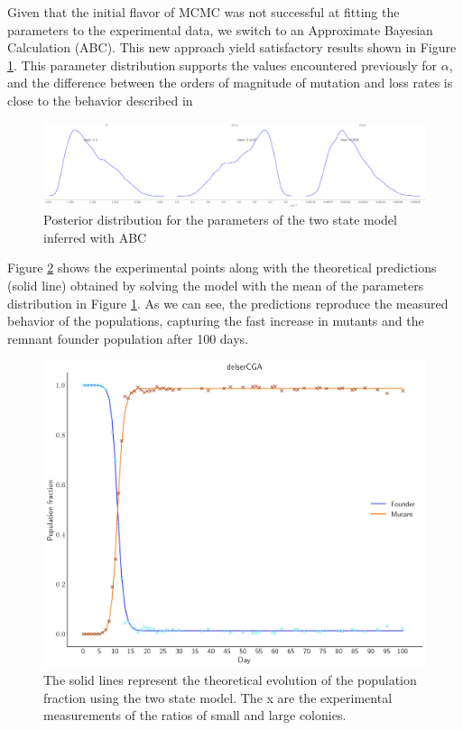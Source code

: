 \documentclass{article}
\begin{document}
Given that the initial flavor of MCMC was not successful at fitting the parameters to the experimental data, we switch to an Approximate Bayesian Calculation (ABC). This new approach yield satisfactory results shown in Figure \ref{fig:abc_2st_posterior}. This parameter distribution supports the values encountered previously for $\alpha$, and the difference between the orders of magnitude of mutation and loss rates is close to the behavior described in \cite{reams_duplication_2010} 
\begin{figure}[H]
	\centering
    \includegraphics[scale=0.3]{plots/abc_2st_posterior.png}
    \caption{Posterior distribution for the parameters of the two state model inferred with ABC}
    \label{fig:abc_2st_posterior}
\end{figure}
Figure \ref{fig:2st_abc_fit} shows the experimental points along with the theoretical predictions (solid line) obtained by solving the model with the mean of the parameters distribution in Figure \ref{fig:abc_2st_posterior}. As we can see, the predictions reproduce the measured behavior of the populations, capturing the fast increase in mutants and the remnant founder population after 100 days.

\begin{figure}[H]
	\centering
    \includegraphics[scale=0.4]{plots/2st_abc_fit.png}
    \caption{The solid lines represent the theoretical evolution of the population fraction using the two state model. The x are the experimental measurements of the ratios of small and large colonies.}
    \label{fig:2st_abc_fit}
\end{figure}
\end{document}
